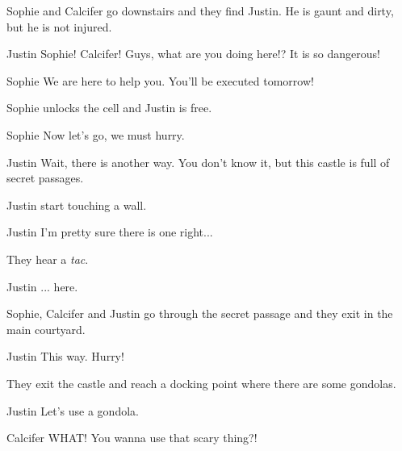 
Sophie and Calcifer go downstairs and they find Justin. He is gaunt and dirty, but he is not injured.

\begin{screenplay}

\begin{dialogue}{Justin}
Sophie! Calcifer! Guys, what are you doing here!? It is so dangerous!
\end{dialogue}

\begin{dialogue}{Sophie}
We are here to help you. You'll be executed tomorrow!
\end{dialogue}

Sophie unlocks the cell and Justin is free.

\begin{dialogue}{Sophie}
Now let's go, we must hurry.
\end{dialogue}

\begin{dialogue}{Justin}
Wait, there is another way. You don't know it, but this castle is full of secret passages.
\end{dialogue}

Justin start touching a wall.

\begin{dialogue}[continued]{Justin}
I'm pretty sure there is one right...
\end{dialogue}

They hear a \textit{tac}.

\begin{dialogue}[continued]{Justin}
... here.
\end{dialogue}

Sophie, Calcifer and Justin go through the secret passage and they exit in the main courtyard.

\begin{dialogue}{Justin}
This way. Hurry! 
\end{dialogue}

They exit the castle and reach a docking point where there are some gondolas.

\begin{dialogue}{Justin}
Let's use a gondola.
\end{dialogue}

\begin{dialogue}[scared]{Calcifer}
WHAT! You wanna use that scary thing?!
\end{dialogue}


\end{screenplay}
